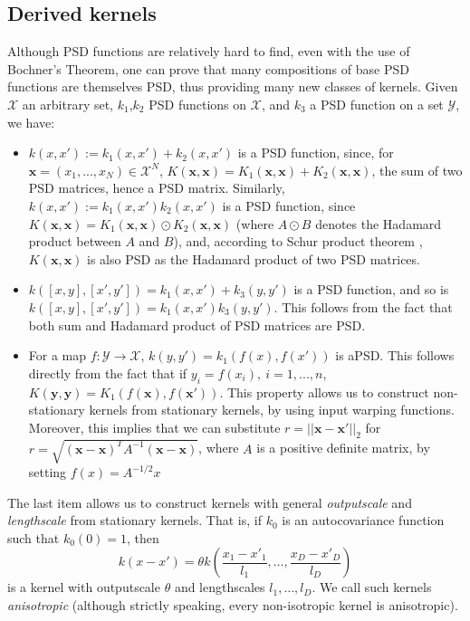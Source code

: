 \subsection{Derived kernels}
Although PSD functions are relatively hard to find, even with the use of Bochner's Theorem, one can prove that many compositions of base PSD functions are themselves PSD, thus providing many new classes of kernels.
Given $\mathcal{X}$ an arbitrary set, $k_1$,$k_2$ PSD functions on $\mathcal{X}$, and $k_3$ a PSD function on a set $\mathcal{Y}$, we have:
\begin{itemize}
	\item $k(x,x') := k_1(x,x') + k_2(x,x')$ is a PSD function, since, for $\mathbf{x} = (x_1,...,x_N) \in \mathcal{X}^N$, $K(\mathbf{x},\mathbf{x}) = K_1(\mathbf{x},\mathbf{x}) + K_2(\mathbf{x},\mathbf{x})$, the sum 
	of two PSD matrices, hence a PSD matrix. Similarly, $k(x,x') := k_1(x,x') k_2(x,x')$ is a PSD function, since $K(\mathbf{x},\mathbf{x}) = K_1(\mathbf{x},\mathbf{x}) \odot K_2(\mathbf{x},\mathbf{x})$ (where $A \odot B$ denotes the Hadamard product between $A$ and $B$), and, according to Schur product theorem \cite{hogben14}, $K(\mathbf{x},\mathbf{x})$ is also PSD as the Hadamard product of two PSD matrices.
	\item $k([x,y],[x',y']) = k_1(x,x') + k_3(y,y')$ is a PSD function, and so is $k([x,y],[x',y']) = k_1(x,x') k_3(y,y')$. This follows from the fact that both sum and Hadamard product of PSD matrices are PSD.
	\item For a map $f : \mathcal{Y} \to \mathcal{X}$, $k(y,y') = k_1(f(x),f(x'))$ is aPSD. This follows directly from the fact that if $y_i = f(x_i), \ i=1,...,n$, 
	$K(\mathbf{y},\mathbf{y}) = K_1(f(\mathbf{x}),f(\mathbf{x}'))$. This property allows us to construct non-stationary kernels from stationary kernels, by using input warping functions. Moreover, 
	this implies that we can substitute $r = ||\mathbf{x} - \mathbf{x}'||_2$ for $r = \sqrt{(\mathbf{x} - \mathbf{x})^T A^{-1} (\mathbf{x} - \mathbf{x})}$, where $A$ is a positive definite matrix, by setting $f(x) = A^{-1/2} x$
\end{itemize}
The last item allows us to construct kernels with general \textit{outputscale} and \textit{lengthscale} from stationary kernels. That is, if $k_0$ is an autocovariance function such that $k_0(0) = 1$, then
\begin{equation}\label{scaledkernels}
k(x-x') = \theta k\left(\frac{x_1-x'_1}{l_1},\ldots,\frac{x_D-x'_D}{l_D}\right) 
\end{equation}
is a kernel with outputscale $\theta$ and lengthscales $l_1,\ldots,l_D$. We call such kernels \textit{anisotropic} (although strictly speaking, every non-isotropic kernel is anisotropic).

